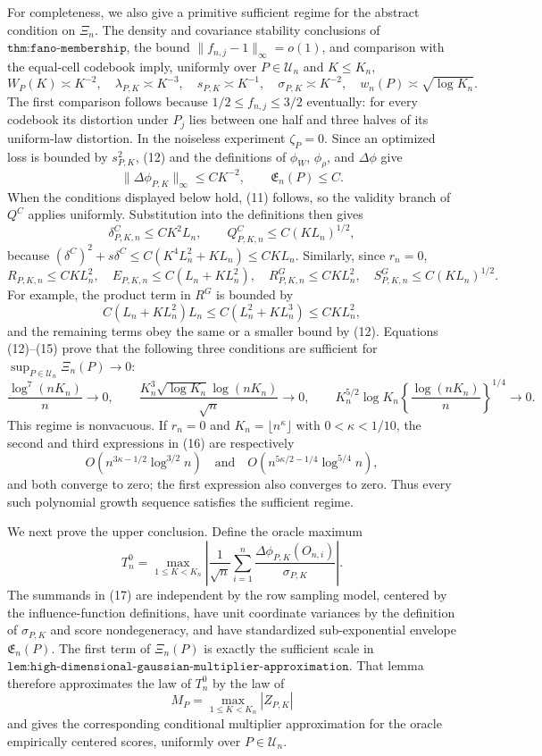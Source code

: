 For completeness, we also give a primitive sufficient regime for the abstract condition on \(\Xi_n\).  The density and covariance stability conclusions of \(\texttt{thm:fano-membership}\), the bound \(\|f_{n,j}-1\|_\infty=o(1)\), and comparison with the equal-cell codebook imply, uniformly over \(P\in\mathcal U_n\) and \(K\leq K_n\),
\[
 W_P(K)\asymp K^{-2},\quad
 \lambda_{P,K}\asymp K^{-3},\quad
 s_{P,K}\asymp K^{-1},\quad
 \sigma_{P,K}\asymp K^{-2},\quad
 w_n(P)\asymp\sqrt{\log K_n}.
 \tag{12}
\]
The first comparison follows because \(1/2\leq f_{n,j}\leq3/2\) eventually: for every codebook its distortion under \(P_j\) lies between one half and three halves of its uniform-law distortion.  In the noiseless experiment \(\zeta_P=0\).  Since an optimized loss is bounded by \(s_{P,K}^2\), (12) and the definitions of \(\phi_W\), \(\phi_\rho\), and \(\Delta\phi\) give
\[
 \|\Delta\phi_{P,K}\|_\infty\leq CK^{-2},\qquad
 \mathfrak E_n(P)\leq C.
 \tag{13}
\]
When the conditions displayed below hold, (11) follows, so the validity branch of \(Q^C\) applies uniformly.  Substitution into the definitions then gives
\[
 \delta^C_{P,K,n}\leq CK^2L_n,\qquad
 Q^C_{P,K,n}\leq C(KL_n)^{1/2},
 \tag{14}
\]
because \((\delta^C)^2+s\delta^C\leq C(K^4L_n^2+KL_n)\leq CKL_n\).  Similarly, since \(r_n=0\),
\[
 R_{P,K,n}\leq CKL_n^2,\quad
 E_{P,K,n}\leq C(L_n+KL_n^2),\quad
 R^G_{P,K,n}\leq CKL_n^2,\quad
 S^G_{P,K,n}\leq C(KL_n)^{1/2}.
 \tag{15}
\]
For example, the product term in \(R^G\) is bounded by
\[
 C(L_n+KL_n^2)L_n\leq C(L_n^2+KL_n^3)\leq CKL_n^2,
\]
and the remaining terms obey the same or a smaller bound by (12).  Equations (12)--(15) prove that the following three conditions are sufficient for \(\sup_{P\in\mathcal U_n}\Xi_n(P)\to0\):
\[
 \frac{\log^7(nK_n)}{n}\longrightarrow0,\qquad
 \frac{K_n^3\sqrt{\log K_n}\log(nK_n)}{\sqrt n}\longrightarrow0,\qquad
 K_n^{5/2}\log K_n
 \left\{\frac{\log(nK_n)}{n}\right\}^{1/4}\longrightarrow0.
 \tag{16}
\]
This regime is nonvacuous.  If \(r_n=0\) and \(K_n=\lfloor n^\kappa\rfloor\) with \(0<\kappa<1/10\), the second and third expressions in (16) are respectively
\[
 O\!\left(n^{3\kappa-1/2}\log^{3/2}n\right)
 \quad\text{and}\quad
 O\!\left(n^{5\kappa/2-1/4}\log^{5/4}n\right),
\]
and both converge to zero; the first expression also converges to zero.  Thus every such polynomial growth sequence satisfies the sufficient regime.

We next prove the upper conclusion.  Define the oracle maximum
\[
 T_n^0=
 \max_{1\leq K<K_n}\left|
 \frac1{\sqrt n}\sum_{i=1}^n
 \frac{\Delta\phi_{P,K}(O_{n,i})}{\sigma_{P,K}}
 \right|.
 \tag{17}
\]
The summands in (17) are independent by the row sampling model, centered by the influence-function definitions, have unit coordinate variances by the definition of \(\sigma_{P,K}\) and score nondegeneracy, and have standardized sub-exponential envelope \(\mathfrak E_n(P)\).  The first term of \(\Xi_n(P)\) is exactly the sufficient scale in \(\texttt{lem:high-dimensional-gaussian-multiplier-approximation}\).  That lemma therefore approximates the law of \(T_n^0\) by the law of
\[
 M_P=\max_{1\leq K<K_n}|Z_{P,K}|
\]
and gives the corresponding conditional multiplier approximation for the oracle empirically centered scores, uniformly over \(P\in\mathcal U_n\).

